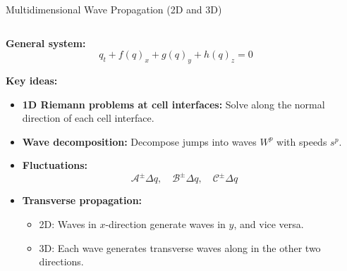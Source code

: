 \begin{frame}{Multidimensional Wave Propagation (2D and 3D)}
	\scriptsize
	\begin{columns}[c]
		
		\begin{column}{0.50\textwidth}
			\textbf{General system:}
			\[
			q_t + f(q)_x + g(q)_y + h(q)_z = 0
			\]
			
			\textbf{Key ideas:}
			\begin{itemize}
				\item \textbf{1D Riemann problems at cell interfaces:}  
				Solve along the normal direction of each cell interface.
				\item \textbf{Wave decomposition:}  
				Decompose jumps into waves \(W^p\) with speeds \(s^p\).
				\item \textbf{Fluctuations:}  
				\[
				\mathcal{A}^\pm \Delta q, \quad 
				\mathcal{B}^\pm \Delta q, \quad 
				\mathcal{C}^\pm \Delta q
				\]
				\item \textbf{Transverse propagation:}  
				\begin{itemize}
					\item 2D: Waves in \(x\)-direction generate waves in \(y\), and vice versa.
					\item 3D: Each wave generates transverse waves along in the other two directions.
				\end{itemize}
			\end{itemize}
		\end{column}
		
		\begin{column}{0.50\textwidth}
			\centering
 
 
\end{column}
\end{columns}
\end{frame}
